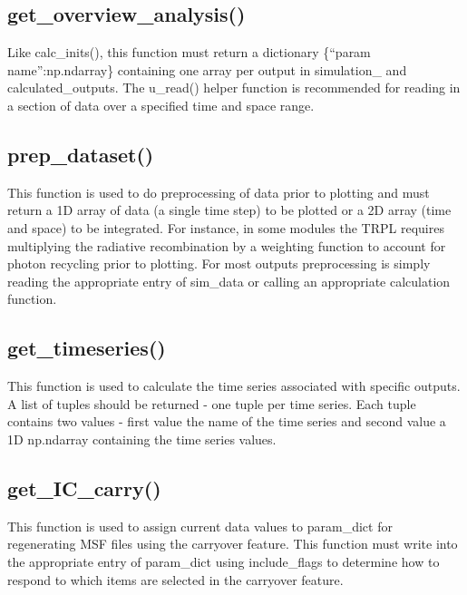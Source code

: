 \documentclass[11pt,letterpaper,titlepage]{article}
\begin{document}
		\subsection{get\_overview\_analysis()}
		\par Like calc\_inits(), this function must return a dictionary \{“param name”:np.ndarray\} containing one array per output in simulation\_ and calculated\_outputs. The u\_read() helper function is recommended for reading in a section of data over a specified time and space range.
		
		\subsection{prep\_dataset()}
		\par This function is used to do preprocessing of data prior to plotting and must return a 1D array of data (a single time step) to be plotted or a 2D array (time and space) to be integrated. For instance, in some modules the TRPL requires multiplying the radiative recombination by a weighting function to account for photon recycling prior to plotting. For most outputs preprocessing is simply reading the appropriate entry of sim\_data or calling an appropriate calculation function.
		
		\subsection{get\_timeseries()}
		\par This function is used to calculate the time series associated with specific outputs. A list of tuples should be returned - one tuple per time series. Each tuple contains two values - first value the name of the time series and second value a 1D np.ndarray containing the time series values. 
		
		\subsection{get\_IC\_carry()}
		\par This function is used to assign current data values to param\_dict for regenerating MSF files using the carryover feature. This function must write into the appropriate entry of param\_dict using include\_flags to determine how to respond to which items are selected in the carryover feature.
\end{document}
